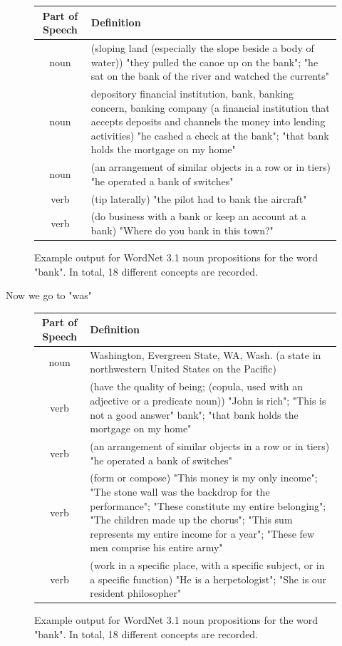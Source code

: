 \documentclass[a4paper,12pt,twoside,openright]{report}
\begin{document}
\begin{figure}[H]
\begin{center}
\begin{tabular}{ | c | p{11cm} | } 
 \hline
 Part of Speech & Definition \\  
 \hline
noun     & (sloping land (especially the slope beside a body of water)) "they pulled the canoe up on the bank"; "he sat on the bank of the river and watched the currents"\\ 
noun     & depository financial institution, bank, banking concern, banking company (a financial institution that accepts deposits and channels the money into lending activities) "he cashed a check at the bank"; "that bank holds the mortgage on my home" \\ 
 noun     & (an arrangement of similar objects in a row or in tiers) "he operated a bank of switches"  \\ 
verb & (tip laterally) "the pilot had to bank the aircraft" \\ 
verb    & (do business with a bank or keep an account at a bank) "Where do you bank in this town?"  \\ 
 \hline
\end{tabular}
\end{center}
\caption{Example output for WordNet 3.1 noun propositions for the word "bank". In total, 18 different concepts are recorded.}
\end{figure}

Now we go to "was"

\begin{figure}[H]
\begin{center}
\begin{tabular}{ | c | p{11cm} | } 
 \hline
 Part of Speech & Definition \\ 
 \hline
noun     & Washington, Evergreen State, WA, Wash. (a state in northwestern United States on the Pacific) \\ 
verb     & (have the quality of being; (copula, used with an adjective or a predicate noun)) "John is rich"; "This is not a good answer"
 bank"; "that bank holds the mortgage on my home" \\ 
 verb     & (an arrangement of similar objects in a row or in tiers) "he operated a bank of switches"  \\ 
verb & (form or compose) "This money is my only income"; "The stone wall was the backdrop for the performance"; "These constitute my entire belonging"; "The children made up the chorus"; "This sum represents my entire income for a year"; "These few men comprise his entire army" \\ 
verb    & (work in a specific place, with a specific subject, or in a specific function) "He is a herpetologist"; "She is our resident philosopher"  \\ 
 \hline
\end{tabular}
\end{center}
\caption{Example output for WordNet 3.1 noun propositions for the word "bank". In total, 18 different concepts are recorded.}
\end{figure}
\end{document}
